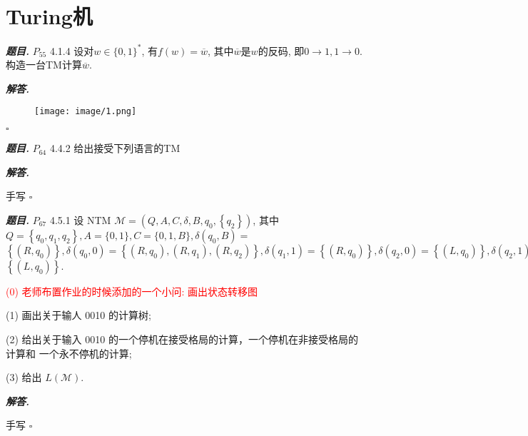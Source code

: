 \documentclass[10pt, a4paper, oneside]{ctexart}
\newenvironment{problem}{\begin{framed}\par\noindent\textbf{\textit{题目. }}}{\end{framed}\par}
\newenvironment{solution}{%
  \par\noindent\textbf{\textit{解答. }}\ignorespaces
}{%
  \hfill\ensuremath{\square}\par
}
\begin{document}
\newpage

\section{Turing机}

\begin{problem}
$P_{55}$ 4.1.4 设对$w\in \{0,1\}^*$, 有$f(w)=\overline{w}$, 其中$\overline{w}$是$w$的反码, 即$0\to 1, 1\to 0$. 构造一台TM计算$\overline{w}$.
\end{problem}

\begin{solution}

\begin{figure}[h]
    \centering
    \texttt{[image: image/1.png]}
\end{figure}
\end{solution}

\begin{problem}
$P_{64}$ 4.4.2 给出接受下列语言的TM
\end{problem}
\begin{solution}
    手写
\end{solution}

\begin{problem}
$P_{67}$ 4.5.1 设 NTM $\mathcal{M}=\left(Q, A, C, \delta, B, q_0,\left\{q_2\right\}\right)$, 其中 $Q=\left\{q_0, q_1, q_2\right\}, A=\{0,1\}, C=\{0,1, B\}, \delta\left(q_0, B\right)=$ $\left\{\left(R, q_0\right)\right\}, \delta\left(q_0, 0\right)=\left\{\left(R, q_0\right),\left(R, q_1\right),\left(R, q_2\right)\right\}, \delta\left(q_1, 1\right)=\left\{\left(R, q_0\right)\right\}, \delta\left(q_2, 0\right)=\left\{\left(L, q_0\right)\right\}, \delta\left(q_2, 1\right)=$ $\left\{\left(L, q_0\right)\right\}$.

\textcolor{red}{(0) 老师布置作业的时候添加的一个小问: 画出状态转移图}

(1) 画出关于输人 0010 的计算树;

(2) 给出关于输入 0010 的一个停机在接受格局的计算，一个停机在非接受格局的计算和 一个永不停机的计算;

(3) 给出 $L(\mathscr{M})$.
\end{problem}
\begin{solution}
    手写
\end{solution}
\end{document}

